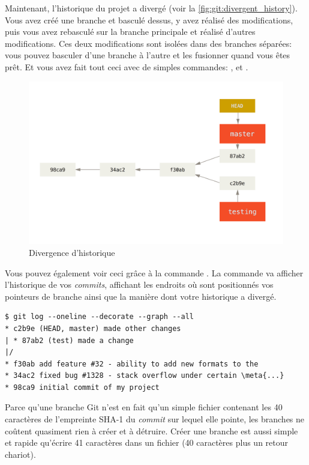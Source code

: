 Maintenant, l'historique du projet a divergé (voir la \autoref{fig:git:divergent_history}).
Vous avez créé une branche et basculé dessus, y avez réalisé des modifications, puis vous avez rebasculé sur la branche principale et réalisé d'autres modifications.
Ces deux modifications sont isolées dans des branches séparées: vous pouvez basculer d'une branche à l'autre et les fusionner quand vous êtes prêt.
Et vous avez fait tout ceci avec de simples commandes: ,  et .

\begin{figure}[H]
  \centering
  \includegraphics{images/advance-master}
  \caption{Divergence d'historique}
  \label{fig:git:divergent_history}
\end{figure}

Vous pouvez également voir ceci grâce à la commande .
La commande  va afficher l'historique de vos \emph{commits}, affichant les endroits où sont positionnés vos pointeurs de branche ainsi que la manière dont votre historique a divergé.
\begin{Schunk}
\begin{Verbatim}[commandchars=\\\{\}]
$ git log --oneline --decorate --graph --all
* c2b9e (HEAD, master) made other changes
| * 87ab2 (test) made a change
|/
* f30ab add feature #32 - ability to add new formats to the
* 34ac2 fixed bug #1328 - stack overflow under certain \meta{...}
* 98ca9 initial commit of my project
\end{Verbatim}
\end{Schunk}

Parce qu'une branche Git n'est en fait qu'un simple fichier contenant les 40 caractères de l'empreinte SHA-1 du \emph{commit} sur lequel elle pointe, les branches ne coûtent quasiment rien à créer et à détruire.
Créer une branche est aussi simple et rapide qu'écrire 41 caractères dans un fichier (40 caractères plus un retour chariot).


